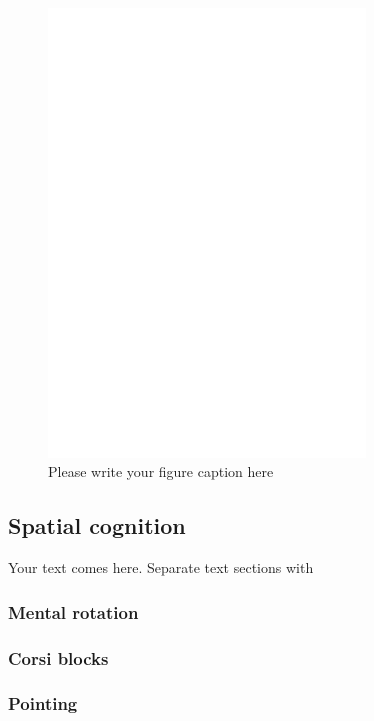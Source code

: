 \begin{figure}[!htb]
  \includegraphics[width=0.75\textwidth]{bfeed_mob}
\caption{Please write your figure caption here}
\label{fig:1}       %
\end{figure}

	\subsection{Spatial cognition}
	\label{sec:3.2}
Your text comes here. Separate text sections with

		\subsubsection{Mental rotation}
		\label{sec:3.2.1}
	
		\subsubsection{Corsi blocks}
		\label{sec:3.2.2}
		
		\subsubsection{Pointing}
		\label{sec:3.2.3}

